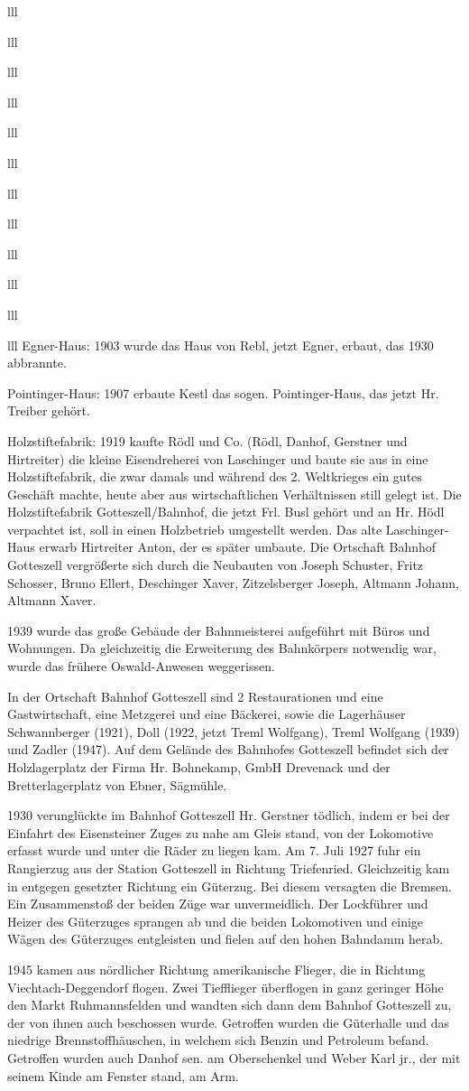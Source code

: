 \documentclass[12pt,a4pager]{book}
\begin{document}
\begin{tabuluar}{lll}
\begin{tabuluar}{lll}
\begin{tabuluar}{lll}
\begin{tabuluar}{lll}
\begin{tabuluar}{lll}
\begin{tabuluar}{lll}
\begin{tabuluar}{lll}
\begin{tabuluar}{lll}
\begin{tabuluar}{lll}
\begin{tabuluar}{lll}
\begin{tabuluar}{lll}
\begin{tabuluar}{lll}
Egner-Haus: 1903 wurde das Haus von Rebl, jetzt Egner, erbaut, das 1930
abbrannte.

Pointinger-Haus: 1907 erbaute Kestl das sogen. Pointinger-Haus, das jetzt Hr.
Treiber gehört.

Holzstiftefabrik: 1919 kaufte Rödl und Co. (Rödl, Danhof, Gerstner und
Hirtreiter) die kleine Eisendreherei von Laschinger und baute sie aus in eine
Holzstiftefabrik, die zwar damals und während des 2. Weltkrieges ein gutes
Geschäft machte, heute aber aus wirtschaftlichen Verhältnissen still gelegt ist.
Die Holzstiftefabrik Gotteszell/Bahnhof, die jetzt Frl. Busl gehört und an Hr.
Hödl verpachtet ist, soll in einen Holzbetrieb umgestellt werden. Das alte
Laschinger-Haus erwarb Hirtreiter Anton, der es später umbaute. Die Ortschaft
Bahnhof Gotteszell vergrößerte sich durch die Neubauten von Joseph Schuster,
Fritz Schosser, Bruno Ellert, Deschinger Xaver, Zitzelsberger Joseph, Altmann
Johann, Altmann Xaver.

1939 wurde das große Gebäude der Bahnmeisterei aufgeführt mit Büros und
Wohnungen. Da gleichzeitig die Erweiterung des Bahnkörpers notwendig war, wurde
das frühere Oswald-Anwesen weggerissen.

In der Ortschaft Bahnhof Gotteszell sind 2 Restaurationen und eine
Gastwirtschaft, eine Metzgerei und eine Bäckerei, sowie die Lagerhäuser
Schwannberger (1921), Doll (1922, jetzt Treml Wolfgang), Treml Wolfgang (1939)
und Zadler (1947). Auf dem Gelände des Bahnhofes Gotteszell befindet sich der
Holzlagerplatz der Firma Hr. Bohnekamp, GmbH Drevenack und der Bretterlagerplatz
von Ebner, Sägmühle.

1930 verunglückte im Bahnhof Gotteszell Hr. Gerstner tödlich, indem er bei der
Einfahrt des Eisensteiner Zuges zu nahe am Gleis stand, von der Lokomotive
erfasst wurde und unter die Räder zu liegen kam. Am 7. Juli 1927 fuhr ein
Rangierzug aus der Station Gotteszell in Richtung Triefenried. Gleichzeitig kam
in entgegen gesetzter Richtung ein Güterzug. Bei diesem versagten die Bremsen.
Ein Zusammenstoß der beiden Züge war unvermeidlich. Der Lockführer und Heizer
des Güterzuges sprangen ab und die beiden Lokomotiven und einige Wägen des
Güterzuges entgleisten und fielen auf den hohen Bahndamm herab.

1945 kamen aus nördlicher Richtung amerikanische Flieger, die in Richtung
Viechtach-Deggendorf flogen. Zwei Tiefflieger überflogen in ganz geringer Höhe
den Markt Ruhmannsfelden und wandten sich dann dem Bahnhof Gotteszell zu, der
von ihnen auch beschossen wurde. Getroffen wurden die Güterhalle und das
niedrige Brennstoffhäuschen, in welchem sich Benzin und Petroleum befand.
Getroffen wurden auch Danhof sen. am Oberschenkel und Weber Karl jr., der mit
seinem Kinde am Fenster stand, am Arm.


\end{tabuluar}
\end{tabuluar}
\end{tabuluar}
\end{tabuluar}
\end{tabuluar}
\end{tabuluar}
\end{tabuluar}
\end{tabuluar}
\end{tabuluar}
\end{tabuluar}
\end{tabuluar}
\end{tabuluar}
\end{document}
